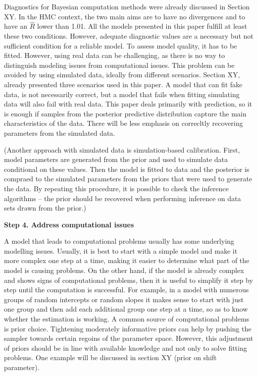 Diagnostics for Bayesian computation methods were already discussed in Section XY.
In the HMC context, the two main aims are to have no divergences and to have an $\hat R$ lower than 1.01.
All the models presented in this paper fulfill at least these two conditions.
However, adequate diagnostic values are a necessary but not sufficient condition for a reliable model.
To assess model quality, it has to be fitted.
However, using real data can be challenging, as there is no way to distinguish modeling issues from computational issues.
This problem can be avoided by using simulated data, ideally from different scenarios.
Section XY, already presented three scenarios used in this paper.
A model that can fit fake data, is not necessarily correct, but a model that fails when fitting simulating data will also fail with real data.
This paper deals primarily with prediction, so it is enough if samples from the posterior predictive distribution capture the main characteristics of the data.
There will be less emphasis on correcltly recovering parameters from the simulated data.

(Another approach with simulated data is simulation-based calibration.
First, model parameters are generated from the prior and used to simulate data conditional on these values.
Then the model is fitted to data and the posterior is compraed to the simulated parameters from the priors that were used to generate the data.
By repeating this procedure, it is possible to check the inference algorithms – the prior should be recovered when performing inference on data sets drawn from the prior.)

\textbf{Step 4. Address computational issues}

A model that leads to computational problems usually has some underlying modelling issues.
Usually, it is best to start with a simple model and make it more complex one step at a time, making it easier to determine what part of the model is causing problems.
On the other hand, if the model is already complex and shows signs of computational problems, then it is useful to simplify it step by step until the computation is successful.
For example, in a model with numerous groups of random intercepts or random slopes it makes sense to start with just one group and then add each additional group one step at a time, so as to know whether the estimation is working.
A common source of computational problems is prior choice.
Tightening moderately informative priors can help by pushing the sampler towards certain regoins of the parameter space.
However, this adjustment of priors should be in line with available knowledge and not only to solve fitting problems.
One example will be discussed in section XY (prior on shift parameter).

